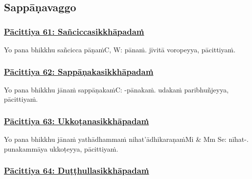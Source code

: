 \subsection{Sappāṇavaggo}

\subsubsection*{\hyperref[exp61]{Pācittiya 61: Sañciccasikkhāpadaṁ}}
\label{pac61}

Yo pana bhikkhu sañcicca pāṇaṁ\makeatletter\hyperlink{endnote-appendix}\makeatother C, W: pānaṁ. jīvitā voropeyya, pācittiyaṁ.



\subsubsection*{\hyperref[exp62]{Pācittiya 62: Sappāṇakasikkhāpadaṁ}}
\label{pac62}

Yo pana bhikkhu jānaṁ sappāṇakaṁ\makeatletter\hyperlink{endnote-appendix}\makeatother C: -pānakaṁ. udakaṁ paribhuñjeyya, pācittiyaṁ.



\subsubsection*{\hyperref[exp63]{Pācittiya 63: Ukkoṭanasikkhāpadaṁ}}
\label{pac63}

Yo pana bhikkhu jānaṁ yathādhammaṁ nihat'ādhikaraṇaṁ\makeatletter\hyperlink{endnote-appendix}\makeatother Mi & Mm Se: nīhat-. punakammāya ukkoṭeyya, pācittiyaṁ.



\subsubsection*{\hyperref[exp64]{Pācittiya 64: Duṭṭhullasikkhāpadaṁ}}
\label{pac64}

